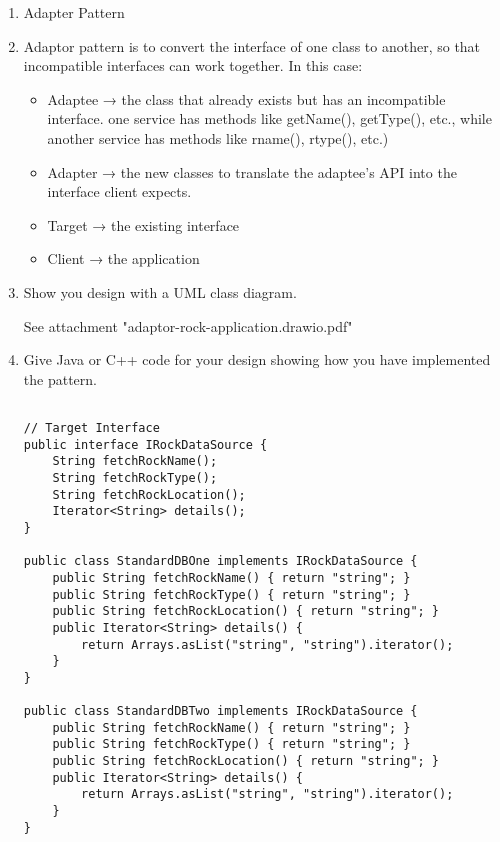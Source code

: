 \begin{enumerate}
    \item Adapter Pattern
    
    \item Adaptor pattern is to convert the interface of one class to another, so that incompatible interfaces can work together. In this case:

    \begin{itemize}
        \item Adaptee → the class that already exists but has an incompatible interface. one service has methods like getName(), getType(), etc., while another service has methods like rname(), rtype(), etc.)
        \item Adapter → the new classes to translate the adaptee’s API into the interface client expects.
       \item Target → the existing interface
        \item Client → the application
    \end{itemize}
    
    \item Show you design with a UML class diagram. 
    
    See attachment "adaptor-rock-application.drawio.pdf"
    
    
    \item Give Java or C++ code for your design showing how you have implemented the pattern. 

\begin{verbatim} 

// Target Interface
public interface IRockDataSource {
    String fetchRockName();
    String fetchRockType();
    String fetchRockLocation();
    Iterator<String> details();
}

public class StandardDBOne implements IRockDataSource {
    public String fetchRockName() { return "string"; }
    public String fetchRockType() { return "string"; }
    public String fetchRockLocation() { return "string"; }
    public Iterator<String> details() {
        return Arrays.asList("string", "string").iterator();
    }
}

public class StandardDBTwo implements IRockDataSource {
    public String fetchRockName() { return "string"; }
    public String fetchRockType() { return "string"; }
    public String fetchRockLocation() { return "string"; }
    public Iterator<String> details() {
        return Arrays.asList("string", "string").iterator();
    }
}


\end{verbatim}
\end{enumerate}
